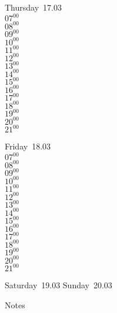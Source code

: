 \documentclass[11pt,a4paper]{book}\usepackage[]{graphicx}\usepackage[]{color}
\begin{document}
\clearpage
\begin{headerbox}
\end{headerbox}
\begin{weekdaybox}
  Thursday~17.03\\
  { 
  \vfill
  $07^{00}$\\
$08^{00}$\\
$09^{00}$\\
$10^{00}$\\
$11^{00}$\\
$12^{00}$\\
$13^{00}$\\
$14^{00}$\\
$15^{00}$\\
$16^{00}$\\
$17^{00}$\\
$18^{00}$\\
$19^{00}$\\
$20^{00}$\\
$21^{00}$\\
  }
\end{weekdaybox} 
\begin{weekdaybox}
  Friday~18.03\\
  { 
  \vfill
  $07^{00}$\\
$08^{00}$\\
$09^{00}$\\
$10^{00}$\\
$11^{00}$\\
$12^{00}$\\
$13^{00}$\\
$14^{00}$\\
$15^{00}$\\
$16^{00}$\\
$17^{00}$\\
$18^{00}$\\
$19^{00}$\\
$20^{00}$\\
$21^{00}$\\
  }
\end{weekdaybox}
\begin{weekendbox}
  Saturday~19.03
  \tcblower
  Sunday~20.03
\end{weekendbox} %
\begin{notebox}
  Notes
\end{notebox}
\clearpage
\end{document}
